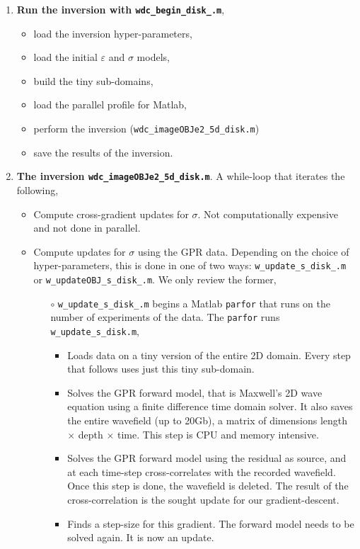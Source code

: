 \documentclass[11pt, oneside]{article}   	%
\begin{document}
\begin{enumerate}
\item {\bf Run the inversion with {\tt wdc\_begin\_disk\_.m}},
\begin{itemize}
\item load the inversion hyper-parameters, 
\item load the initial $\varepsilon$ and $\sigma$ models,
\item build the tiny sub-domains,
\item load the parallel profile for Matlab,
\item perform the inversion ({\tt wdc\_imageOBJe2\_5d\_disk.m})
\item save the results of the inversion.
\end{itemize}
\item {\bf The inversion {\tt wdc\_imageOBJe2\_5d\_disk.m}}. A while-loop that iterates the following,
\begin{itemize}
\item Compute cross-gradient updates for $\sigma$. Not computationally expensive and not done in parallel.
\item Compute updates for $\sigma$ using the GPR data. Depending on the choice of hyper-parameters, this is done in one of two ways: {\tt w\_update\_s\_disk\_.m} or {\tt w\_updateOBJ\_s\_disk\_.m}. We only review the former,
\begin{itemize}
\item[$\circ$] {\tt w\_update\_s\_disk\_.m} begins a Matlab {\tt parfor} that runs on the number of experiments of the data. The {\tt parfor} runs {\tt w\_update\_s\_disk.m},
\begin{itemize}
\item Loads data on a tiny version of the entire 2D domain. Every step that follows uses just this tiny sub-domain.
\item Solves the GPR forward model, that is Maxwell's 2D wave equation using a finite difference time domain solver. It also saves the entire wavefield (up to 20Gb), a matrix of dimensions length $\times$ depth $\times$ time. This step is CPU and memory intensive. 
\item Solves the GPR forward model using the residual as source, and at each time-step cross-correlates with the recorded wavefield. Once this step is done, the wavefield is deleted. The result of the cross-correlation is the sought update for our gradient-descent. 
\item Finds a step-size for this gradient. The forward model needs to be solved again. It is now an update.

\end{itemize}
\end{itemize}
\end{itemize}
\end{enumerate}
\end{document}

